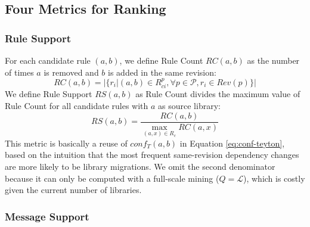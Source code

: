 \documentclass[conference, 10pt]{IEEEtran}
\begin{document}
\subsection{Four Metrics for Ranking} %

\subsubsection{Rule Support} 
\label{subsec:rs}

For each candidate rule $(a,b)$, we define Rule Count $RC(a,b)$ as the number of times $a$ is removed and $b$ is added in the same revision:
\begin{equation}
    RC(a,b)=|\{ r_i | (a,b)\in R_{ci}^p, \forall p \in \mathcal{P}, r_i \in Rev(p) \}|
\end{equation}
We define Rule Support $RS(a,b)$ as Rule Count divides the maximum value of Rule Count for all candidate rules with $a$ as source library:
\begin{equation}
    RS(a,b)=\frac{RC(a,b)}{\max_{(a,x)\in R_c}RC(a,x)}
\end{equation}
This metric is basically a reuse of $conf_T(a,b)$ in Equation \ref{eq:conf-teyton}, based on the intuition that the most frequent same-revision dependency changes are more likely to be library migrations. 
We omit the second denominator because it can only be computed with a full-scale mining ($Q=\mathcal{L}$), which is costly given the current number of libraries.

\subsubsection{Message Support} 
\label{sec:message-support}
\end{document}
